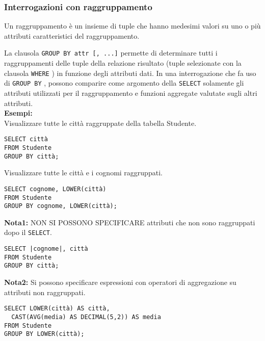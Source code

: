 \documentclass[a4paper, 10pt, titlepage]{article}
\begin{document}
	\subsubsection{Interrogazioni con raggruppamento}
		Un raggruppamento è un insieme di tuple che hanno medesimi valori su
		uno o più attributi caratteristici del raggruppamento.
		
		\noindent
		La clausola \lstinline|GROUP BY attr [, ...]| permette di determinare tutti i
		raggruppamenti delle tuple della relazione risultato (tuple selezionate
		con la clausola \lstinline|WHERE| ) in funzione degli attributi dati.
		In una interrogazione che fa uso di \lstinline|GROUP BY| , possono comparire come
		argomento della \lstinline|SELECT| solamente gli attributi utilizzati per il
		raggruppamento e funzioni aggregate valutate sugli altri attributi.\medskip \\
		\textbf{Esempi: }\\		
		Visualizzare tutte le città raggruppate della tabella Studente.
		\begin{lstlisting}
SELECT città
FROM Studente
GROUP BY città;
		\end{lstlisting}
		Visualizzare tutte le città e i cognomi raggruppati.
		\begin{lstlisting}[mathescape]
SELECT cognome, LOWER(città)
FROM Studente
GROUP BY cognome, LOWER(città);
		\end{lstlisting}
		\textbf{Nota1: }NON SI POSSONO SPECIFICARE attributi che non sono raggruppati dopo il
		\lstinline|SELECT|.
		
		\begin{lstlisting}
SELECT |cognome|, città
FROM Studente
GROUP BY città;
		\end{lstlisting}
		
		\noindent
		\textbf{Nota2: }Si possono specificare espressioni con operatori di aggregazione su attributi
		non raggruppati.
		\begin{lstlisting}
SELECT LOWER(città) AS città,
  CAST(AVG(media) AS DECIMAL(5,2)) AS media
FROM Studente
GROUP BY LOWER(città);
		\end{lstlisting}
		
\end{document}
